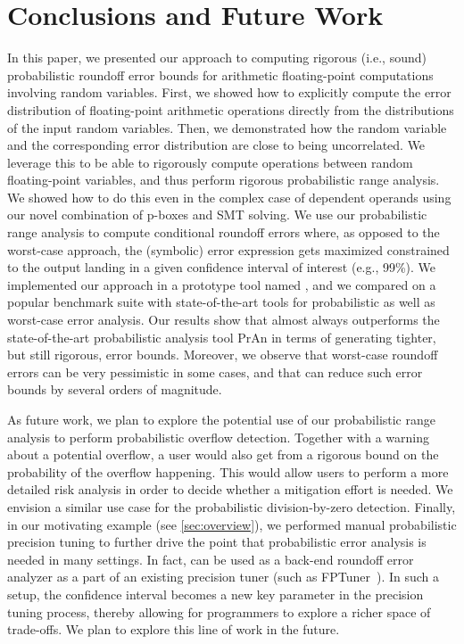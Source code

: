 \section{Conclusions and Future Work}
\label{sec:conclusions}

In this paper, we presented our approach to computing rigorous (i.e., sound)
probabilistic roundoff error bounds for arithmetic floating-point computations
involving random variables. 
%
First, we showed how to explicitly compute the error distribution of
floating-point arithmetic operations directly from the distributions of the
input random variables.
%
Then, we demonstrated how the random variable and the corresponding error
distribution are close to being uncorrelated.
%
We leverage this to be able to rigorously compute operations between random
floating-point variables, and thus perform rigorous probabilistic range
analysis.
%
We showed how to do this even in the complex case of dependent operands using
our novel combination of p-boxes and SMT solving.
%
We use our probabilistic range analysis to compute conditional roundoff errors
where, as opposed to the worst-case approach, the (symbolic) error expression
gets maximized constrained to the output landing in a given confidence interval
of interest (e.g., 99\%). 
%
We implemented our approach in a prototype tool named \Tool, and we compared
\Tool on a popular benchmark suite with state-of-the-art tools for
probabilistic as well as worst-case error analysis.
%
Our results show that \Tool almost always outperforms the state-of-the-art
probabilistic analysis tool PrAn in terms of generating tighter, but still
rigorous, error bounds.
%
Moreover, we observe that worst-case roundoff errors can be very pessimistic in
some cases, and that \Tool can reduce such error bounds by several orders of
magnitude.



As future work, we plan to explore the potential use of our probabilistic range
analysis to perform probabilistic overflow detection.
%
Together with a warning about a potential overflow, a user would also
get from \Tool a rigorous bound on the probability of the overflow happening.
%
This would allow users to perform a more detailed risk analysis in order to decide
whether a mitigation effort is needed.
%
We envision a similar use case for the probabilistic division-by-zero
detection.
%
Finally, in our motivating example (see \cref{sec:overview}), we performed
manual probabilistic precision tuning to further drive the point that
probabilistic error analysis is needed in many settings.
%
In fact, \Tool can be used as a back-end roundoff error analyzer as a part of
an existing precision tuner (such as FPTuner~\cite{fptuner}).
%
In such a setup, the confidence interval becomes a new key parameter in the
precision tuning process, thereby allowing for programmers to explore a richer
space of trade-offs.
%
We plan to explore this line of work in the future.

